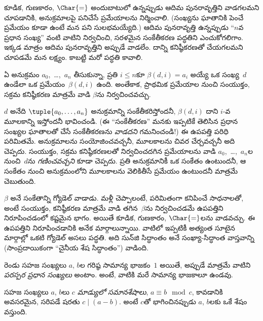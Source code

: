 \documentclass[../../../include/open-logic-section]{subfiles}
\begin{document}


కూడిక, గుణకారం, $\Char{=}$ అందుబాటులో ఉన్నప్పుడు ఆదిమ పునరావృత్తిని
వాడగలమని చూపడానికి, అనుక్రమాలపై పనిచేసే ప్రమేయాలను నిర్మించాలి.
(సంఖ్యను ఘాతానికి పెంచే ప్రమేయం కూడా ఉంటే మన పని సులభమయ్యేది.) ఆదిమ పునరావృత్తి ఉన్నప్పుడు
``$n$వ ప్రధాన సంఖ్య'' వంటి వాటిని నిర్వచించి, సరళమైన సంకేతీకరణ పద్ధతిని
ఎంచుకోగలిగాం. ఇక్కడ మాత్రం ఆదిమ పునరావృత్తిని అప్పుడే వాడలేం.
దాన్ని కనిష్ఠీకరణతో చేయగలమని చూపడమే మన లక్ష్యం. కాబట్టి మరో పద్ధతి కావాలి.

\begin{lem}
ఏ అనుక్రమం $a_0$,~\dots,~$a_n$ తీసుకున్నా, ప్రతి $i\le n$కూ
$\beta(d,i)=a_i$ అయ్యే ఒక సంఖ్య~$d$ ఉండేలా ఒక ప్రమేయం~$\beta(d,i)$ ఉంది.
అంతేకాక, ప్రాథమిక ప్రమేయాల నుంచి సంయుక్తం, సక్రమ కనిష్ఠీకరణ మాత్రమే వాడి
$\beta$ను నిర్వచించవచ్చు.
\end{lem}

$d$ అనేది $\tuple{a_0,\dots,a_n}$ అనుక్రమాన్ని సంకేతీకరిస్తోందనీ,
$\beta(d,i)$ దాని $i$-వ మూలకాన్ని ఇస్తోందనీ భావించండి. (ఈ ``సంకేతీకరణ'' మనకు
ఇప్పటికే తెలిసిన ప్రధాన సంఖ్యల ఘాతాలతో చేసే సంకేతీకరణను \emph{వాడదని} గమనించండి!)
ఈ ఉపపత్తి పరిధి పరిమితమే. అనుక్రమాలను సంయోజించవచ్చనీ, మూలకాలను చివర
చేర్చవచ్చనీ అది చెప్పదు. సంయుక్తం, సక్రమ కనిష్ఠీకరణలతో నిర్వచించదగిన
ప్రమేయాలను వాడి $a_0$,~\dots,~$a_n$ల నుంచి~$d$ను \emph{గణించవచ్చని} కూడా
చెప్పదు. ప్రతి అనుక్రమానికీ ఒక సంకేతం ఉంటుందనీ, ఆ సంకేతం నుంచి అనుక్రమంలోని
మూలకాలను వెలికితీసే ప్రమేయం ఉంటుందనీ మాత్రమే చెబుతుంది.

$\beta$ అనే సంకేతాన్ని గ్యోడెల్ వాడాడు. మళ్లీ చెప్పాలంటే, పరిమితంగా కనిపించే సాధనాలతో,
అంటే సంయుక్తం, కనిష్ఠీకరణ మాత్రమే వాడి తగిన~$\beta$ను నిర్వచించడమే ఉపపత్తిని
నిరూపించడంలో కష్టమైన భాగం. అయితే కూడిక, గుణకారం, $\Char{=}$లను వాడవచ్చు.
ఈ ఉపపత్తిని నిరూపించడానికి అనేక మార్గాలున్నాయి. వాటిలో ఇప్పటికీ
అత్యంత సూటైన మార్గాల్లో ఒకటి గ్యోడెల్ అసలు పద్ధతి. అది సున్‌జి సిద్ధాంతం
అనే సంఖ్యా-సిద్ధాంత వాస్తవాన్ని (సాంప్రదాయికంగా ``చైనీయ శేష సిద్ధాంతం'')
వాడింది.

\begin{defn}
రెండు సహజ సంఖ్యలు $a$, $b$ల గరిష్ఠ సామాన్య భాజకం~$1$ అయితే, అప్పుడే మాత్రమే
వాటిని \emph{పరస్పర ప్రధాన సంఖ్యలు} అంటాం. అంటే, వాటికి మరే సామాన్య
భాజకాలూ ఉండవు.
\end{defn}

\begin{defn}
సహజ సంఖ్యలు $a$, $b$లు \emph{$c$ మాడ్యులో సమానశేషాలు},
$a\equiv b\mod c$, కావడానికి అవసరమైన, సరిపడే షరతు $c\mid(a-b)$. అంటే $c$తో భాగించినప్పుడు
$a$, $b$లకు ఒకే శేషం వస్తుంది.
\end{defn}
\end{document}
